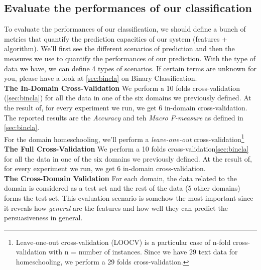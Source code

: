 \subsection{Evaluate the performances of our classification}
To evaluate the performances of our classification, we should define a bunch of metrics that quantify the prediction capacities of our system (features + algorithm). We'll first see the different scenarios of prediction and then the measures we use to quantify the performances of our prediction. With the type of data we have, we can define 4 types of scenarios. If certain terms are unknown for you, please have a look at \cref{sec:bincla} on Binary Classification.
\\

\textbf{The In-Domain Cross-Validation}
We perform a 10 folds cross-validation (\cref{sec:bincla}) for all the data in one of the six domains we previously defined. At the result of, for every experiment we run, we get 6 in-domain cross-validation. The reported results are the \emph{Accuracy} and teh \emph{Macro F-measure} as defined in \cref{sec:bincla}.
\\
For the domain homeschooling, we'll perform a \emph{leave-one-out} cross-validation\footnote{Leave-one-out cross-validation (LOOCV) is a particular case of n-fold cross-validation with n = number of instances. Since we have 29 text data for homeschooling, we perform a 29 folds cross-validation.}
\\

\textbf{The Full Cross-Validation}
We perform a 10 folds cross-validation\ref{sec:bincla} for all the data in one of the six domains we previously defined. At the result of, for every experiment we run, we get 6 in-domain cross-validation.
\\

\textbf{The Cross-Domain Validation}
For each domain, the data related to the domain is considered as a test set and the rest of the data (5 other domains) forms the test set. This evaluation scenario is somehow the most important since it reveals how \emph{general} are the features and how well they can predict the persuasiveness in general.
\\


